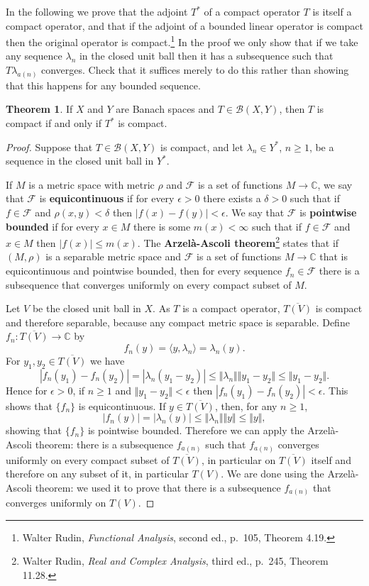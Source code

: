 \documentclass{article}
\newcommand{\inner}[2]{\langle #1, #2 \rangle}
\newcommand{\norm}[1]{\Vert #1 \Vert}
\theoremstyle{definition}
\newtheorem{theorem}{Theorem}
\begin{document}
In the following we prove that the adjoint $T^*$ of a compact operator $T$ is itself a compact operator,
and that if the adjoint of a bounded linear operator is compact then the original operator  is compact.\footnote{Walter Rudin, {\em Functional Analysis}, second ed., p.~105, Theorem 4.19.}
In the proof we only show that if we take any sequence $\lambda_n$ in the closed unit ball then it has a subsequence such that
$T\lambda_{a(n)}$ converges. Check that it suffices merely to do this rather than showing that this happens for any bounded sequence.

\begin{theorem}
If $X$ and $Y$ are Banach spaces and $T \in \mathscr{B}(X,Y)$, then $T$ is compact if and only if
$T^*$ is compact.
\label{adjointcompact}
\end{theorem}
\begin{proof}
Suppose that $T \in \mathscr{B}(X,Y)$ is compact, and let $\lambda_n \in Y^*$, $n \geq 1$, be a sequence in the closed unit ball in $Y^*$.

If $M$ is a metric space with metric $\rho$ and $\mathcal{F}$ is a set of functions $M \to \mathbb{C}$,
we say that $\mathcal{F}$ is \textbf{equicontinuous} if for every $\epsilon>0$ there exists a $\delta>0$ such that
if $f \in \mathcal{F}$ and $\rho(x,y)<\delta$ then $|f(x)-f(y)|<\epsilon$.
We say that $\mathcal{F}$ is \textbf{pointwise bounded} if for every $x \in M$ there is some $m(x)<\infty$ such that
if $f \in \mathcal{F}$ and $x \in M$ then $|f(x)| \leq m(x)$.
The \textbf{Arzel\`a-Ascoli theorem}\footnote{Walter Rudin, {\em Real and Complex Analysis}, third ed., p.~245, Theorem 11.28.}
 states that if $(M,\rho)$ is a separable metric space and $\mathcal{F}$ is a set of functions $M \to \mathbb{C}$ that is equicontinuous and pointwise bounded,
then for every sequence $f_n \in \mathcal{F}$ there is a subsequence that converges uniformly on every compact subset of $M$.

Let $V$ be the closed unit ball in $X$.
As $T$ is a compact operator, $\overline{T(V)}$ is compact and therefore separable, because any compact
metric space is separable. 
Define $f_n:\overline{T(V)} \to \mathbb{C}$ by 
\[
f_n(y) = \inner{y}{\lambda_n} = \lambda_n(y).
\]
For $y_1,y_2 \in \overline{T(V)}$ we have
\[
|f_n(y_1)-f_n(y_2)| = |\lambda_n(y_1-y_2)| \leq \norm{\lambda_n} \norm{y_1-y_2} \leq \norm{y_1-y_2}.
\]
Hence for $\epsilon>0$, if $n \geq 1$ and $\norm{y_1-y_2} < \epsilon$ then $|f_n(y_1)-f_n(y_2)|<\epsilon$. This shows
that $\{f_n\}$ is equicontinuous. If $y \in \overline{T(V)}$, then, for any $n \geq 1$,
\[
|f_n(y)| = |\lambda_n(y)| \leq \norm{\lambda_n} \norm{y} \leq \norm{y},
\]
showing that $\{f_n\}$ is pointwise bounded. Therefore we can apply the Arzel\`a-Ascoli theorem: there is a subsequence
$f_{a(n)}$ such that $f_{a(n)}$ converges uniformly on every compact subset of $\overline{T(V)}$, in particular on
$\overline{T(V)}$ itself and therefore on any subset of it, in particular $T(V)$. We are done using the Arzel\`a-Ascoli theorem: we used it to prove that there is a subsequence
$f_{a(n)}$ that converges uniformly on $T(V)$.


\end{proof}
\end{document}
